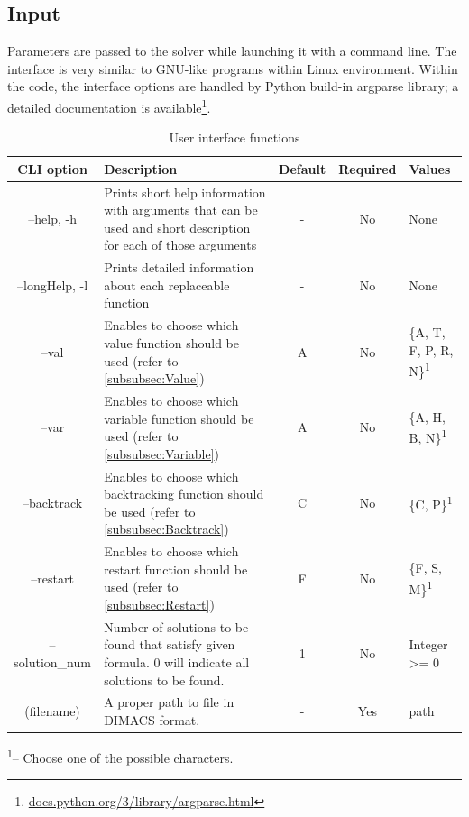 \documentclass[12pt,english,pdflatex]{aghdpl}
\providecommand{\tabularnewline}{\\}
\begin{document}
\subsection{Input}
\label{subsec:Input}

Parameters are passed to the solver while launching it with a command line.
The interface is very similar to GNU-like programs within Linux environment.
Within the code, the interface options are handled by Python build-in argparse library; a detailed   documentation is available\footnote{\url{docs.python.org/3/library/argparse.html}}. 

\begin{table}[H]
\begin{centering}
\begin{tabular}{|c|>{\centering}p{0.22\paperwidth}|c|c|>{\centering}p{0.1\paperwidth}|}
\hline 
CLI option & Description & Default & Required & Values \tabularnewline
\hline 
\hline 
–help, -h & Prints short help information with arguments that can be used and
short description for each of those arguments  & - & No & None\tabularnewline
\hline 
–longHelp, -l & Prints detailed information about each replaceable function & - & No & None\tabularnewline
\hline 
–val & Enables to choose which value function should be used (refer to \ref{subsubsec:Value}) & A & No & \{A, T, F, P, R, N\}\textsuperscript{1}\tabularnewline
\hline 
–var & Enables to choose which variable function should be used (refer to
\ref{subsubsec:Variable}) & A & No & \{A, H, B, N\}\textsuperscript{1}\tabularnewline
\hline 
–backtrack & Enables to choose which backtracking function should be used (refer
to \ref{subsubsec:Backtrack}) & C & No & \{C, P\}\textsuperscript{1}\tabularnewline
\hline 
–restart & Enables to choose which restart function should be used (refer to
\ref{subsubsec:Restart}) & F & No & \{F, S, M\}\textsuperscript{1}\tabularnewline
\hline 
–solution\_num & Number of solutions to be found that satisfy given formula. 0 will indicate
all solutions to be found. & 1 & No & Integer >= 0\tabularnewline
\hline 
(filename) & A proper path to file in DIMACS format. & - & Yes & path\tabularnewline
\hline 
\end{tabular}
\par\end{centering}
\textsuperscript{1}-- Choose one of the possible characters. 
\caption{User interface functions}
\end{table}
\end{document}
